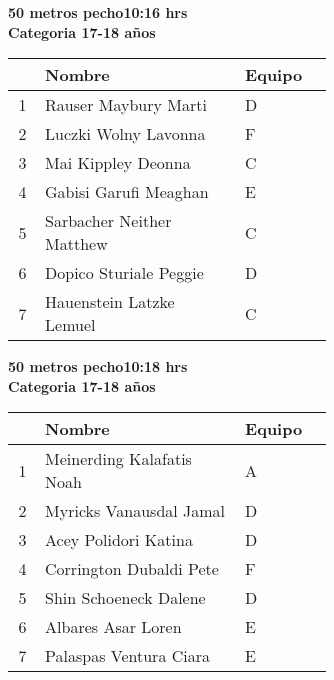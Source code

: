 \begin{minipage}{0.95\linewidth}\vspace{0.5cm} 
\begin{flushleft}
\textbf{
\hspace{-0.15cm}50 metros pecho\hspace{1.5cm}10:16 hrs \\Categoria 17-18 años}\vspace{-0.2cm} 
\end{flushleft}
\begin{tabular}{cp{0.63\linewidth}l}
\hline
& \textbf{Nombre} & \textbf{Equipo} \\ \hline
1 & Rauser Maybury Marti & D \\ 
2 & Luczki Wolny Lavonna & F \\ 
3 & Mai Kippley Deonna & C \\ 
4 & Gabisi Garufi Meaghan & E \\ 
5 & Sarbacher Neither Matthew & C \\ 
6 & Dopico Sturiale Peggie & D \\ 
7 & Hauenstein Latzke Lemuel & C \\ 
\end{tabular}
\end{minipage}
\begin{minipage}{0.95\linewidth}\vspace{0.5cm} 
\begin{flushleft}
\textbf{
\hspace{-0.15cm}50 metros pecho\hspace{1.5cm}10:18 hrs \\Categoria 17-18 años}\vspace{-0.2cm} 
\end{flushleft}
\begin{tabular}{cp{0.63\linewidth}l}
\hline
& \textbf{Nombre} & \textbf{Equipo} \\ \hline
1 & Meinerding Kalafatis Noah & A \\ 
2 & Myricks Vanausdal Jamal & D \\ 
3 & Acey Polidori Katina & D \\ 
4 & Corrington Dubaldi Pete & F \\ 
5 & Shin Schoeneck Dalene & D \\ 
6 & Albares Asar Loren & E \\ 
7 & Palaspas Ventura Ciara & E \\ 
\end{tabular}
\end{minipage}
